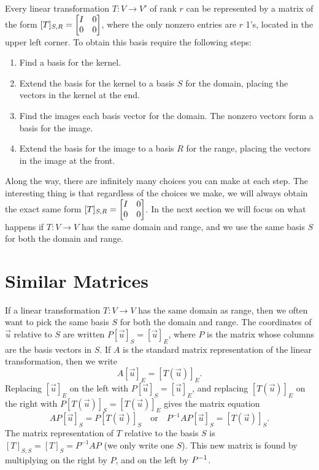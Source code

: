 Every linear transformation $T\colon V\to V'$ of rank $r$ can be represented by a matrix of the form $[T]_{S,R}=\begin{bmatrix} I&0\\0&0 \end{bmatrix}$, where the only nonzero entries are $r$ 1's, located in the upper left corner. To obtain this basis require the following steps: 
\begin{enumerate}
	\item Find a basis for the kernel.
	\item Extend the basis for the kernel to a basis $S$ for the domain, placing the vectors in the kernel at the end.
	\item Find the images each basis vector for the domain. The nonzero vectors form a basis for the image.
	\item Extend the basis for the image to a basis $R$ for the range, placing the vectors in the image at the front.  
\end{enumerate}
Along the way, there are infinitely many choices you can make at each step.  The interesting thing is that regardless of the choices we make, we will always obtain the exact same form $[T]_{S,R}=\begin{bmatrix} I&0\\0&0 \end{bmatrix}$. In the next section we will focus on what happens if $T\colon V\to V$ has the same domain and range, and we use the same basis $S$ for both the domain and range. 



\newpage
\section{Similar Matrices}
If a linear transformation $T\colon V\to V$ has the same domain as range, then we often want to pick the same basis $S$ for both the domain and range. 
The coordinates of $\vec u$ relative to $S$ are written $P[\vec u]_S = [\vec u]_E$, where $P$ is the matrix whose columns are the basis vectors in $S$. 
If $A$ is the standard matrix representation of the linear transformation, then we write 
$$A[\vec u]_E = [T(\vec u)]_E.$$  
Replacing $[\vec u]_E$ on the left with $P[\vec u]_S = [\vec u]_E$, and replacing $[T(\vec u)]_E$ on the right with $P[T(\vec u)]_S = [T(\vec u)]_E$ gives the matrix equation 
$$AP[\vec u]_S = P[T(\vec u)]_S\quad \text{or}\quad P^{-1}AP [\vec u]_S = [T(\vec u)]_S.$$ The matrix representation of $T$ relative to the basis $S$ is $[T]_{S,S}=[T]_S = P^{-1}AP$ (we only write one $S$). 
This new matrix is found by multiplying on the right by $P$, and on the left by $P^{-1}$.    

